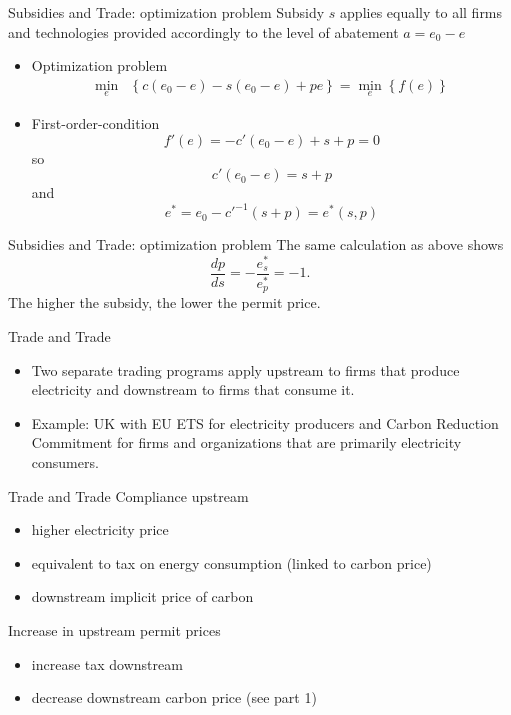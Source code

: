 

{Subsidies and Trade: optimization problem}
Subsidy $s$ applies equally to all firms and technologies provided accordingly to the level of abatement $a = e_0 - e$ \\
\begin{itemize}
\item <1-> Optimization problem
\begin{align}
\min_{e} & \left\{c(e_0-e)-s(e_0-e)+pe\right\} = \min_{e}\left\{f(e)\right\}
\end{align}
\item <2-> First-order-condition
\[
f'(e)=-c'(e_0-e)+ s+p = 0
\]
so
\[
c'(e_0-e)=s+p
\]
and
\[
e^*=e_0-c'^{-1}(s+p)=e^*(s,p)
\]
\end{itemize}




{Subsidies and Trade: optimization problem}
The same calculation as above shows
\[
\frac{dp}{ds} = -\frac{e^*_s}{e^*_p}=-1.
\]
The higher the subsidy, the lower the permit price.



{Trade and Trade}
\begin{itemize}
\item<1-> Two separate trading programs apply upstream to firms that produce electricity and downstream to firms that consume it.
\item<2-> Example: UK with EU ETS for electricity producers and Carbon Reduction Commitment for firms and organizations that are primarily electricity consumers.
\end{itemize}



{Trade and Trade}
Compliance upstream
\begin{itemize}
\item <1-> higher electricity price
\item <2-> equivalent to tax on energy consumption (linked to carbon price)
\item <3-> downstream implicit price of carbon
\end{itemize}
Increase in upstream permit prices
\begin{itemize}
\item <1-> increase tax downstream
\item <2-> decrease downstream carbon price (see part 1)
\end{itemize}



